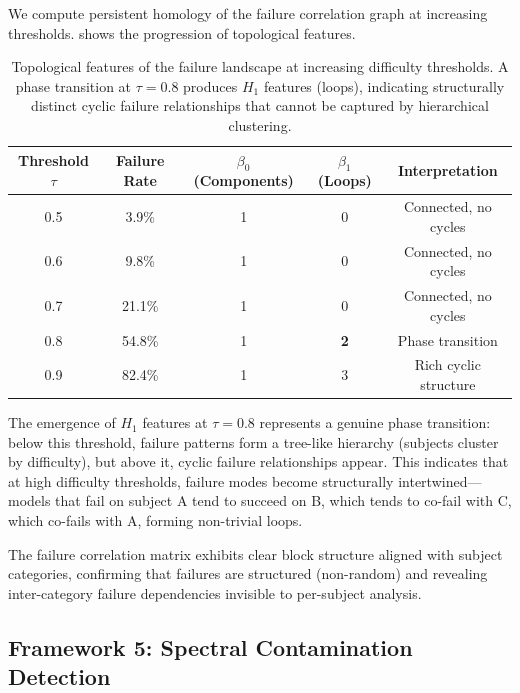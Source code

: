 We compute persistent homology of the failure correlation graph at increasing thresholds.
 shows the progression of topological features.

\begin{table}[t]
    \centering
    \caption{Topological features of the failure landscape at increasing difficulty thresholds. A phase transition at $\tau = 0.8$ produces $H_1$ features (loops), indicating structurally distinct cyclic failure relationships that cannot be captured by hierarchical clustering.}
    \begin{tabular}{@{}ccccc@{}}
        \toprule
        Threshold $\tau$ & Failure Rate & $\beta_0$ (Components) & $\beta_1$ (Loops) & Interpretation \\
        \midrule
        0.5 & 3.9\% & 1 & 0 & Connected, no cycles \\
        0.6 & 9.8\% & 1 & 0 & Connected, no cycles \\
        0.7 & 21.1\% & 1 & 0 & Connected, no cycles \\
        0.8 & 54.8\% & 1 & \textbf{2} & Phase transition \\
        0.9 & 82.4\% & 1 & 3 & Rich cyclic structure \\
        \bottomrule
    \end{tabular}
    \label{tab:failure}
\end{table}

The emergence of $H_1$ features at $\tau = 0.8$ represents a genuine phase transition: below this threshold, failure patterns form a tree-like hierarchy (subjects cluster by difficulty), but above it, cyclic failure relationships appear.
This indicates that at high difficulty thresholds, failure modes become structurally intertwined---models that fail on subject A tend to succeed on B, which tends to co-fail with C, which co-fails with A, forming non-trivial loops.

The failure correlation matrix exhibits clear block structure aligned with subject categories, confirming that failures are structured (non-random) and revealing inter-category failure dependencies invisible to per-subject analysis.

\subsection{Framework 5: Spectral Contamination Detection}

